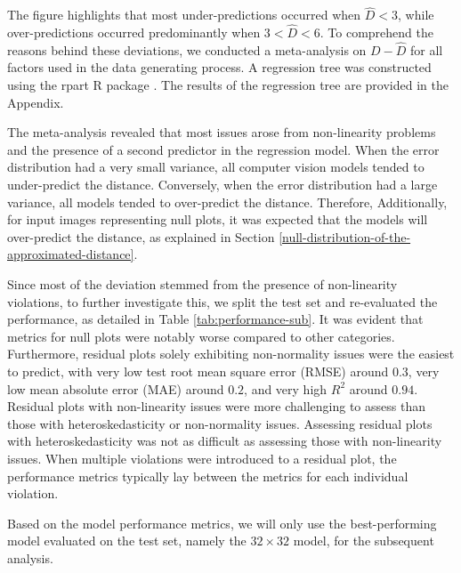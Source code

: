 \documentclass[]{interact}
\theoremstyle{plain}%
\theoremstyle{definition}
\theoremstyle{remark}
\begin{document}
The figure highlights that most under-predictions occurred when
\(\hat{D} < 3\), while over-predictions occurred predominantly when
\(3 < \hat{D} < 6\). To comprehend the reasons behind these deviations,
we conducted a meta-analysis on \(D - \hat{D}\) for all factors used in
the data generating process. A regression tree was constructed using the
rpart R package \citep{Terry2022rpart}. The results of the regression
tree are provided in the Appendix.

The meta-analysis revealed that most issues arose from non-linearity
problems and the presence of a second predictor in the regression model.
When the error distribution had a very small variance, all computer
vision models tended to under-predict the distance. Conversely, when the
error distribution had a large variance, all models tended to
over-predict the distance. Therefore, Additionally, for input images
representing null plots, it was expected that the models will
over-predict the distance, as explained in Section
\ref{null-distribution-of-the-approximated-distance}.

Since most of the deviation stemmed from the presence of non-linearity
violations, to further investigate this, we split the test set and
re-evaluated the performance, as detailed in Table
\ref{tab:performance-sub}. It was evident that metrics for null plots
were notably worse compared to other categories. Furthermore, residual
plots solely exhibiting non-normality issues were the easiest to
predict, with very low test root mean square error (RMSE) around
\(0.3\), very low mean absolute error (MAE) around \(0.2\), and very
high \(R^2\) around \(0.94\). Residual plots with non-linearity issues
were more challenging to assess than those with heteroskedasticity or
non-normality issues. Assessing residual plots with heteroskedasticity
was not as difficult as assessing those with non-linearity issues. When
multiple violations were introduced to a residual plot, the performance
metrics typically lay between the metrics for each individual violation.

Based on the model performance metrics, we will only use the
best-performing model evaluated on the test set, namely the
\(32 \times 32\) model, for the subsequent analysis.
\end{document}
